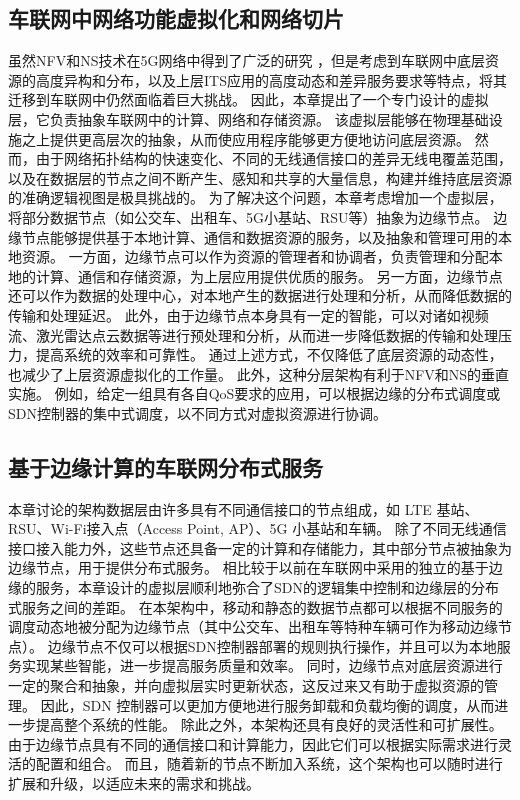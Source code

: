 \subsection{车联网中网络功能虚拟化和网络切片}
虽然NFV和NS技术在5G网络中得到了广泛的研究 \cite{zhu2021wang}，但是考虑到车联网中底层资源的高度异构和分布，以及上层ITS应用的高度动态和差异服务要求等特点，将其迁移到车联网中仍然面临着巨大挑战。
因此，本章提出了一个专门设计的虚拟层，它负责抽象车联网中的计算、网络和存储资源。
该虚拟层能够在物理基础设施之上提供更高层次的抽象，从而使应用程序能够更方便地访问底层资源。
然而，由于网络拓扑结构的快速变化、不同的无线通信接口的差异无线电覆盖范围，以及在数据层的节点之间不断产生、感知和共享的大量信息，构建并维持底层资源的准确逻辑视图是极具挑战的。
为了解决这个问题，本章考虑增加一个虚拟层，将部分数据节点（如公交车、出租车、5G小基站、RSU等）抽象为边缘节点。
边缘节点能够提供基于本地计算、通信和数据资源的服务，以及抽象和管理可用的本地资源。
一方面，边缘节点可以作为资源的管理者和协调者，负责管理和分配本地的计算、通信和存储资源，为上层应用提供优质的服务。
另一方面，边缘节点还可以作为数据的处理中心，对本地产生的数据进行处理和分析，从而降低数据的传输和处理延迟。
此外，由于边缘节点本身具有一定的智能，可以对诸如视频流、激光雷达点云数据等进行预处理和分析，从而进一步降低数据的传输和处理压力，提高系统的效率和可靠性。
通过上述方式，不仅降低了底层资源的动态性，也减少了上层资源虚拟化的工作量。
此外，这种分层架构有利于NFV和NS的垂直实施。
例如，给定一组具有各自QoS要求的应用，可以根据边缘的分布式调度或SDN控制器的集中式调度，以不同方式对虚拟资源进行协调。

\subsection{基于边缘计算的车联网分布式服务}

本章讨论的架构数据层由许多具有不同通信接口的节点组成，如 LTE 基站、RSU、Wi-Fi接入点（Access Point, AP）、5G 小基站和车辆。
除了不同无线通信接口接入能力外，这些节点还具备一定的计算和存储能力，其中部分节点被抽象为边缘节点，用于提供分布式服务。
相比较于以前在车联网中采用的独立的基于边缘的服务，本章设计的虚拟层顺利地弥合了SDN的逻辑集中控制和边缘层的分布式服务之间的差距。
在本架构中，移动和静态的数据节点都可以根据不同服务的调度动态地被分配为边缘节点（其中公交车、出租车等特种车辆可作为移动边缘节点）。
边缘节点不仅可以根据SDN控制器部署的规则执行操作，并且可以为本地服务实现某些智能，进一步提高服务质量和效率。
同时，边缘节点对底层资源进行一定的聚合和抽象，并向虚拟层实时更新状态，这反过来又有助于虚拟资源的管理。
因此，SDN 控制器可以更加方便地进行服务卸载和负载均衡的调度，从而进一步提高整个系统的性能。
除此之外，本架构还具有良好的灵活性和可扩展性。
由于边缘节点具有不同的通信接口和计算能力，因此它们可以根据实际需求进行灵活的配置和组合。
而且，随着新的节点不断加入系统，这个架构也可以随时进行扩展和升级，以适应未来的需求和挑战。

